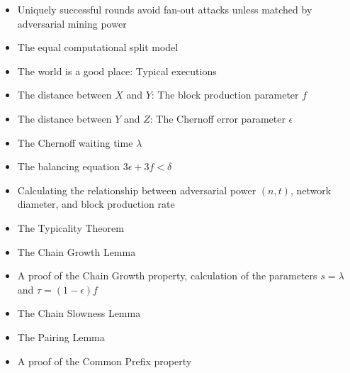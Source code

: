 {\begin{itemize}
\item Uniquely successful rounds avoid fan-out attacks unless matched by adversarial mining power
\item The equal computational split model
\item The world is a good place: Typical executions
\item The distance between $X$ and $Y$: The block production parameter $f$
\item The distance between $Y$ and $Z$: The Chernoff error parameter $\epsilon$
\item The Chernoff waiting time $\lambda$
\item The balancing equation $3\epsilon + 3f < \delta$
\item Calculating the relationship between adversarial power $(n, t)$, network diameter, and block production rate
\item The Typicality Theorem
\item The Chain Growth Lemma
\item A proof of the Chain Growth property, calculation of the parameters $s=\lambda$ and $\tau=(1 - \epsilon)f$
\item The Chain Slowness Lemma
\item The Pairing Lemma
\item A proof of the Common Prefix property
\end{itemize}
}
